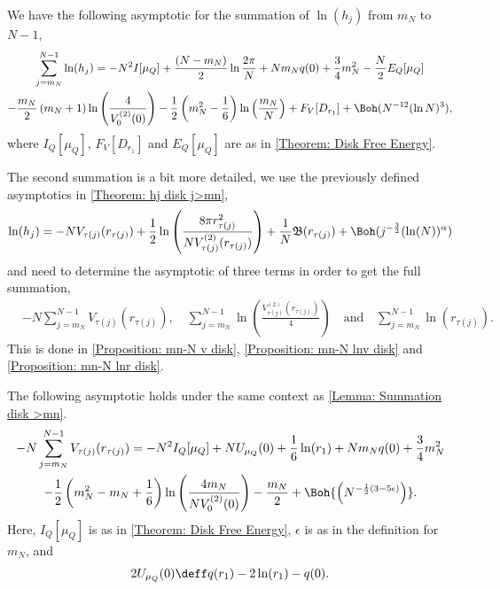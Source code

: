 \begin{lema}	\label{Lemma: Summation disk >mn}
	We have the following asymptotic for the summation of $\ln(h_j)$ from $m_N$ to $N-1$,
	\begin{multline}
		\sum_{j=m_N}^{N-1} \ln (h_j) = -N^2 I[\mu_Q] + \frac{(N-m_N)}{2} \ln{\frac{2\pi}{N}} +  N m_N q(0) + \frac{3}{4} m_N^2 - \frac{N}{2} E_Q[\mu_Q] \\ - \frac{m_N}{2} \left(m_N + 1\right) \ln{\left(\frac{4}{V^{(2)}_0(0)}\right)} - \frac{1}{2} \left( m_N^2 - \frac{1}{6} \right) \ln{\left(\frac{m_N}{N}\right)} + F_V[D_{r_1}] + \Boh(N^{-12} (\ln N)^3),
	\end{multline}
	where $I_Q[\mu_Q] $,  $F_V[D_{r_1}]$ and $E_Q[\mu_Q]$ are as in \autoref{Theorem: Disk Free Energy}.
\end{lema}

The second summation is a bit more detailed, we use the previously defined asymptotics in \autoref{Theorem: hj disk j>mn},
\begin{equation}
	\ln(h_j) = -N V_{\tau(j)} (r_{\tau(j)}) + \frac{1}{2} \ln{\left( \frac{8\pi r^2_{\tau(j)}}{N V^{(2)}_{\tau(j)}(r_{\tau(j)})}  \right)} + \frac{1}{N} \mathfrak{B}(r_{\tau(j)}) + \Boh(j^{-\frac{3}{2}} (\ln(N))^\alpha)
\end{equation}
and need to determine the asymptotic of three terms in order to get the full summation,
\begin{align}
	& -N\sum_{j=m_N}^{N-1} V_{\tau(j)}(r_{\tau(j)}), \quad \sum_{j=m_N}^{N-1} \ln \left( \frac{V^{(2)}_{\tau(j)}(r_{\tau(j)})}{4}\right)  \quad \text{and} \quad \sum_{j=m_N}^{N-1}  \ln(r_{\tau(j)}).
\end{align}
This is done in \autoref{Proposition: mn-N v disk}, \autoref{Proposition: mn-N lnv disk} and \autoref{Proposition: mn-N lnr disk}.

\begin{proposicao}	\label{Proposition: mn-N v disk}
	The following asymptotic holds under the same context as \autoref{Lemma: Summation disk >mn}.
	\begin{multline}
		-N \sum_{j=m_N}^{N-1} V_{\tau(j)}(r_{\tau(j)}) = -N^2 I_Q[\mu_Q]  + N U_{\mu_Q}(0) + \frac{1}{6} \ln(r_1) + N m_N q(0) + \frac{3}{4} m_N^2 \\ - \frac{1}{2} \left(m_N^2 - m_N + \frac{1}{6} \right) \ln{\left(\frac{4 m_N}{N V^{(2)}_0(0)}\right)} - \frac{m_N}{2} + \Boh{\left(N^{-\frac{1}{2}(3-5\epsilon)}\right)}.
	\end{multline}
	Here, $I_Q[\mu_Q] $ is as in \autoref{Theorem: Disk Free Energy}, $\epsilon$ is as in the definition for $m_N$, and
	\begin{equation}
		 2 U_{\mu_Q}(0) \deff q(r_1) - 2 \ln(r_1) - q(0).
	\end{equation}
\end{proposicao}

